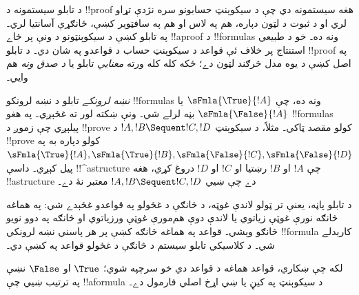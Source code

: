 \documentclass[../../../include/open-logic-section]{subfiles}
\begin{document}


د تابلو سيستمونه د !!{proof} هغه سيستمونه دي چې د
سيکوېنټ حسابونو سره نژدې تړاو لري او د ثبوت د لټون دپاره،
هم په لاس او هم په سافټوير کښې، ځانګړې آسانتيا لري۔ په
تابلو کښې د سيکوېنټونو د ونې پر ځاے !!a{proof} د
!!{formula}s ونه ده۔ خو د طبيعي استنتاج پر خلاف ئې قواعد د
سيکوېنټ حساب د قواعدو په شان دي۔ د تابلو !!{proof} په اصل
کښې د يوه مدل څرګند لټون دے؛ ځکه کله کله ورته
\emph{معنايي} تابلو يا \emph{د صدق ونه} هم وايي۔

\emph{نښه لرونکے} تابلو د نښه لرونکو !!{formula}s ونه
ده، چې $\sFmla{\True}{!A}$ يا $\sFmla{\False}{!A}$ بڼه
لرلے شي۔ ونې ښکته لور ته غځېږي۔ په هغو !!{formula}s پيلېږي
چې زموږ د !!{prove} کولو مقصد ټاکي۔ مثلاً، د سيکوېنټ
$!A, !B \Sequent !C, !D$ د !!{prove} کولو دپاره به په
$\sFmla{\True}{!A}, \sFmla{\True}{!B},
\sFmla{\False}{!C}, \sFmla{\False}{!D}$ پيل کېږي۔ داسې
!!^a{structure} چې $!A$ او $!B$ رښتيا او $!C$ او $!D$ دروغ
کړي، هغه !!a{structure} دے چې ښيي
$!A, !B \Sequent !C, !D$ معتبر نۀ دے۔

د تابلو پاڼه، يعنې تر ټولو لاندې غوټه، د څانګې د
غځولو په قواعدو غځېدے شي: په هماغه څانګه نورې غوټې زياتوي
يا لاندې دوې هم‌مورې غوټې ورزياتوي او څانګه په دوو نويو
څانګو وېشي۔ قواعد په هماغه څانګه کښې پر هر پاسني نښه
لرونکي !!{formula} کارېدلے شي۔ د کلاسيکي تابلو سيستم
 د څانګې د غځولو قواعد په  کښې دي۔



لکه چې ښکاري، قواعد هماغه د  قواعد دي خو سرچپه
شوي؛ $\True$ او $\False$ نښې په ترتيب ښيي چې
!!a{formula} د سيکوېنټ په کيڼ يا ښي اړخ اصلي فارمول دے۔
\end{document}
